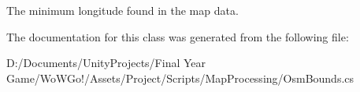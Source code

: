 The minimum longitude found in the map data. 



The documentation for this class was generated from the following file\+:\begin{DoxyCompactItemize}
\item 
D\+:/\+Documents/\+Unity\+Projects/\+Final Year Game/\+Wo\+W\+Go!/\+Assets/\+Project/\+Scripts/\+Map\+Processing/Osm\+Bounds.\+cs\end{DoxyCompactItemize}
